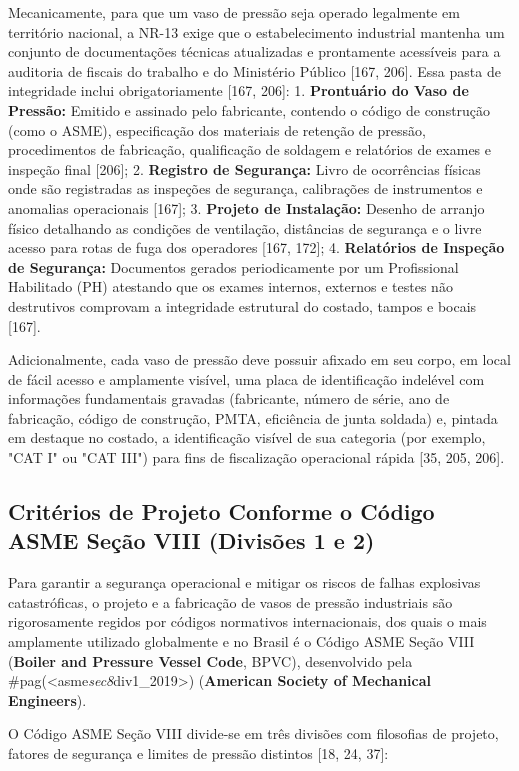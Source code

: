 Mecanicamente, para que um vaso de pressão seja operado legalmente em território nacional, a NR-13 exige que o estabelecimento industrial mantenha um conjunto de documentações técnicas atualizadas e prontamente acessíveis para a auditoria de fiscais do trabalho e do Ministério Público [167, 206]. Essa pasta de integridade inclui obrigatoriamente [167, 206]:
1. \textbf{Prontuário do Vaso de Pressão:} Emitido e assinado pelo fabricante, contendo o código de construção (como o ASME), especificação dos materiais de retenção de pressão, procedimentos de fabricação, qualificação de soldagem e relatórios de exames e inspeção final [206];
2. \textbf{Registro de Segurança:} Livro de ocorrências físicas onde são registradas as inspeções de segurança, calibrações de instrumentos e anomalias operacionais [167];
3. \textbf{Projeto de Instalação:} Desenho de arranjo físico detalhando as condições de ventilação, distâncias de segurança e o livre acesso para rotas de fuga dos operadores [167, 172];
4. \textbf{Relatórios de Inspeção de Segurança:} Documentos gerados periodicamente por um Profissional Habilitado (PH) atestando que os exames internos, externos e testes não destrutivos comprovam a integridade estrutural do costado, tampos e bocais [167].

Adicionalmente, cada vaso de pressão deve possuir afixado em seu corpo, em local de fácil acesso e amplamente visível, uma placa de identificação indelével com informações fundamentais gravadas (fabricante, número de série, ano de fabricação, código de construção, PMTA, eficiência de junta soldada) e, pintada em destaque no costado, a identificação visível de sua categoria (por exemplo, "CAT I" ou "CAT III") para fins de fiscalização operacional rápida [35, 205, 206].


\subsection{Critérios de Projeto Conforme o Código ASME Seção VIII (Divisões 1 e 2)}

Para garantir a segurança operacional e mitigar os riscos de falhas explosivas catastróficas, o projeto e a fabricação de vasos de pressão industriais são rigorosamente regidos por códigos normativos internacionais, dos quais o mais amplamente utilizado globalmente e no Brasil é o Código ASME Seção VIII (\textbf{Boiler and Pressure Vessel Code}, BPVC), desenvolvido pela #pag(<asme\textit{sec8}div1_2019>) (\textbf{American Society of Mechanical Engineers}).

O Código ASME Seção VIII divide-se em três divisões com filosofias de projeto, fatores de segurança e limites de pressão distintos [18, 24, 37]:

